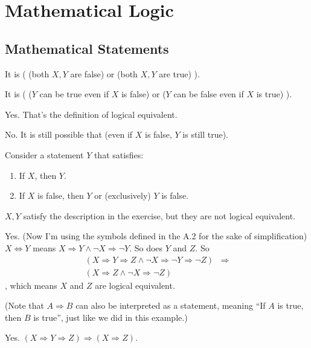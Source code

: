 
\section{Mathematical Logic}

\subsection{Mathematical Statements}

It is ( (both $X, Y$ are false) or (both $X, Y$ are true) ).

It is ( ($Y$ can be true even if $X$ is false) or ($Y$ can be false even if $X$ is true) ).

Yes. That's the definition of logical equivalent.

No. It is still possible that (even if $X$ is false, $Y$ is still true).

Consider a statement $Y$ that satisfies:
\begin{enumerate}
\item If $X$, then $Y$.
\item If $X$ is false, then $Y$ or (exclusively) $Y$ is false.
\end{enumerate}

$X,Y$ satisfy the description in the exercise, but they are not logical equivalent.

Yes. (Now I'm using the symbols defined in the A.2 for the sake of simplification)
$X \Longleftrightarrow Y$ means $X \Longrightarrow Y \wedge \neg X \Longrightarrow \neg Y$. So does $Y$ and 
$Z$. So 
\begin{align*}
(X \Longrightarrow Y \Longrightarrow Z \wedge \neg X \Longrightarrow \neg Y \Longrightarrow \neg Z)
&\Longrightarrow \\
(X \Longrightarrow Z \wedge \neg X \Longrightarrow \neg Z)
\end{align*}
, which means $X$ and $Z$ are logical equivalent.

(Note that $A \Longrightarrow B$ can also be interpreted as a statement, meaning ``If $A$ is true, then $B$ 
is true'', just like we did in this example.)

Yes. $(X \Longrightarrow Y \Longrightarrow Z) \Longrightarrow (X \Longrightarrow Z)$. 

